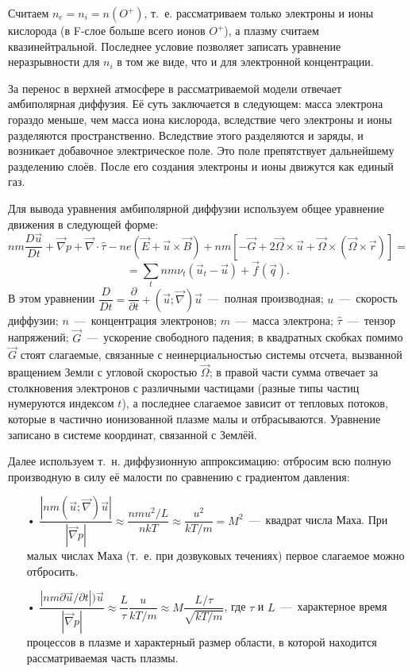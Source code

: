 \documentclass[14pt, a4paper, fleqn]{extarticle}
\begin{document}
Считаем $n_e=n_i = n(O^+)$, т.~е. рассматриваем только электроны и ионы кислорода (в F-слое больше всего ионов $O^+$), а плазму считаем квазинейтральной. Последнее условие позволяет записать уравнение неразрывности для $n_i$ в том же виде, что и для электронной концентрации.

\medskip

За перенос в верхней атмосфере в рассматриваемой модели отвечает амбиполярная диффузия. Её суть заключается в следующем: масса электрона гораздо меньше, чем масса иона кислорода, вследствие чего электроны и ионы разделяются пространственно. Вследствие этого разделяются и заряды, и возникает добавочное электрическое поле. Это поле препятствует дальнейшему разделению слоёв. После его создания электроны и ионы движутся как единый газ.

Для вывода уравнения амбиполярной диффузии используем общее уравнение движения в следующей форме: $$nm\dfrac{D\vec{u}}{Dt}+\vec{\nabla} p + \vec{\nabla}\cdot \hat{\tau} - ne(\vec{E}+\vec{u}\times \vec{B})+nm[-\vec{G}+2\vec{\Omega}\times \vec{u}+\vec{\Omega}\times(\vec{\Omega}\times\vec{r})]=$$
$$=\sum_t nm\nu_t (\vec{u}_t-\vec{u})+ \vec{f}(\vec{q}).$$
В этом уравнении $\dfrac{D}{Dt}=\dfrac{\partial}{\partial t}+(\vec{u}; \vec{\nabla})\vec{u}$~---~полная производная; $u$~---~скорость диффузии; $n$~---~концентрация электронов; $m$~---~масса электрона; $\hat{\tau}$~---~тензор напряжений; $\vec{G}$~---~ускорение свободного падения; в квадратных скобках помимо $\vec{G}$ стоят слагаемые, связанные с неинерциальностью системы отсчета, вызванной вращением Земли с угловой скоростью $\vec{\Omega}$; в правой части сумма отвечает за столкновения электронов с различными частицами (разные типы частиц нумеруются индексом $t$), а последнее слагаемое зависит от тепловых потоков, которые в частично ионизованной плазме малы и отбрасываются. Уравнение записано в системе координат, связанной с Землёй.

\bigskip

Далее используем т.~н. диффузионную аппроксимацию: отбросим всю полную производную в силу её малости по сравнению с градиентом давления:

\begin{itemize}

\item[•] $\dfrac{|nm(\vec{u}; \vec{\nabla})\vec{u}|}{|\vec{\nabla}p|}\approx \dfrac{nmu^2/L}{nkT}\approx \dfrac{u^2}{kT/m}=M^2$~---~квадрат числа Маха. При малых числах Маха (т.~е. при дозвуковых течениях) первое слагаемое можно отбросить.

\item[•] $\dfrac{|nm\partial\vec{u}/\partial t|)\vec{u}}{|\vec{\nabla}p|}\approx \dfrac{L}{\tau} \dfrac{u}{kT/m}\approx M\dfrac{L/\tau}{\sqrt{kT/m}}$, где $\tau$ и $L$~---~характерное время процессов в плазме и характерный размер области, в которой находится рассматриваемая часть плазмы.

\end{itemize}
\end{document}
